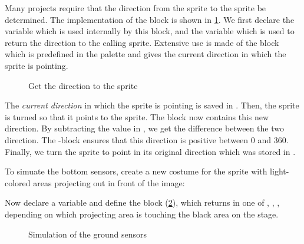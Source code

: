 
Many projects require that the direction from the  sprite to
the  sprite be determined. The implementation of the block
 is shown in \cref{fig.get-dir}. We
first declare the variable  which is used internally
by this block, and the variable  which is
used to return the direction to the calling sprite. Extensive use is
made of the block  which is predefined in the
 palette and gives the current direction in which the sprite
is pointing.

\begin{figure}[htb]
\caption{Get the direction to the  sprite}\label{fig.get-dir}
\end{figure}

The \emph{current direction} in which the sprite is pointing is saved in
. Then, the  sprite is turned so that it
points to the  sprite. The block  now
contains this new direction. By subtracting the value in
, we get the difference between the two direction. The
-block ensures that this direction is positive between 0 and 360.
Finally, we turn the  sprite to point in its original
direction which was stored in .



To simuate the bottom sensors, create a new costume for the 
sprite with light-colored areas projecting out in front of the image:


Now declare a variable  and define the block
 (\cref{fig.get-touching}), which returns in
 one of , , , 
depending on which projecting area is touching the black area on the
stage.

\begin{figure}
\caption{Simulation of the ground sensors}\label{fig.get-touching}
\end{figure}